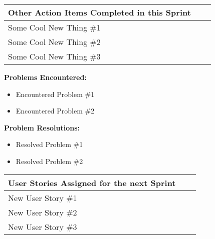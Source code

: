 \documentclass[12pt]{article}
\begin{document}
\vspace{5mm}


\begin{tabularx}{\textwidth}{|X|l|l|}
    \hline \textbf{Other Action Items Completed in this Sprint} \\
    \hline Some Cool New Thing \#1 \\ 
    \hline Some Cool New Thing \#2 \\
    \hline Some Cool New Thing \#3 \\
    \hline
\end{tabularx}

\pagebreak

\begin{flushleft}
\textbf{Problems Encountered:} \\
\begin{itemize}
    \item Encountered Problem \#1
    \item Encountered Problem \#2
\end{itemize}
\end{flushleft}

\begin{flushleft}
\textbf{Problem Resolutions:} \\
\begin{itemize}
    \item Resolved Problem \#1
    \item Resolved Problem \#2
\end{itemize}
\end{flushleft}

\vspace{10mm}


\begin{tabularx}{\textwidth}{|X|l|l|}
    \hline \textbf{User Stories Assigned for the next Sprint} \\
    \hline New User Story \#1 \\ 
    \hline New User Story \#2 \\
    \hline New User Story \#3 \\
    \hline
\end{tabularx}
\end{document}
